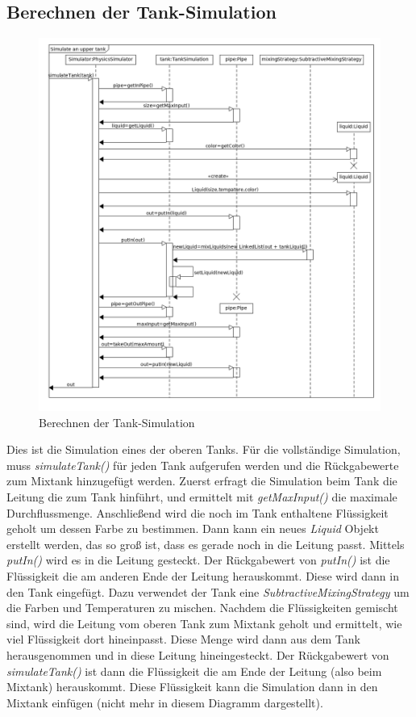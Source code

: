 \documentclass[parskip=full]{scrartcl}
\begin{document}
\subsection{Berechnen der Tank-Simulation}
\begin{figure}[H]
  \centering
  \includegraphics[scale=0.45]{design/sequence-diagrams/tank-simulation.png}
  \caption{Berechnen der Tank-Simulation}
\end{figure}
Dies ist die Simulation eines der oberen Tanks. Für die vollständige Simulation, muss \emph{simulateTank()} für jeden Tank aufgerufen werden
und die Rückgabewerte zum Mixtank hinzugefügt werden. Zuerst erfragt die Simulation beim Tank die Leitung die zum Tank hinführt, und ermittelt
mit \emph{getMaxInput()} die maximale Durchflussmenge. Anschließend wird die noch im Tank enthaltene Flüssigkeit geholt um dessen Farbe zu bestimmen.
Dann kann ein neues \emph{Liquid} Objekt erstellt werden, das so groß ist, dass es gerade noch in die Leitung passt. Mittels \emph{putIn()} wird es
in die Leitung gesteckt. Der Rückgabewert von \emph{putIn()} ist die Flüssigkeit die am anderen Ende der Leitung herauskommt. Diese wird dann in den
Tank eingefügt. Dazu verwendet der Tank eine \emph{SubtractiveMixingStrategy} um die Farben und Temperaturen zu mischen. Nachdem die Flüssigkeiten
gemischt sind, wird die Leitung vom oberen Tank zum Mixtank geholt und ermittelt, wie viel Flüssigkeit dort hineinpasst. Diese Menge wird dann aus dem
Tank herausgenommen und in diese Leitung hineingesteckt. Der Rückgabewert von \emph{simulateTank()} ist dann die Flüssigkeit die am Ende der Leitung
(also beim Mixtank) herauskommt. Diese Flüssigkeit kann die Simulation dann in den Mixtank einfügen (nicht mehr in diesem Diagramm dargestellt).
\end{document}
